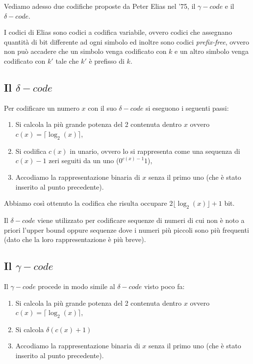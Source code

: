 \documentclass[a4paper,11pt]{book}
\begin{document}
Vediamo adesso due codifiche proposte da Peter Elias nel '75, il $\gamma-code$ e il $\delta-code$.

I codici di Elias sono codici a codifica variabile, ovvero codici che assegnano quantit\`a di bit differente ad ogni simbolo ed inoltre sono codici \emph{prefix-free}, ovvero non pu\`o accadere che un simbolo venga codificato con $k$ e un altro simbolo venga codificato con $k'$ tale che $k'$ \`e prefisso di $k$.

\subsection{Il $\delta-code$}

Per codificare un numero $x$ con il suo $\delta-code$ si eseguono i seguenti passi:
\begin{enumerate}
\item Si calcola la pi\`u grande potenza del 2 contenuta dentro $x$ ovvero $c(x) = \lceil \log_2 (x) \rceil$,
\item Si codifica $c(x)$ in unario, ovvero lo si rappresenta come una sequenza di $c(x)-1$ zeri seguiti da un uno ($0^{c(x)-1}1$),
\item Accodiamo la rappresentazione binaria di $x$ senza il primo uno (che \`e stato inserito al punto precedente). 
\end{enumerate}

Abbiamo cos\`i ottenuto la codifica che risulta occupare $2 \lfloor \log_2 (x) \rfloor + 1$ bit.

Il $\delta-code$ viene utilizzato per codificare sequenze di numeri di cui non \`e noto a priori l'upper bound oppure sequenze dove i numeri pi\`u piccoli sono pi\`u frequenti (dato che la loro rappresentazione \`e pi\`u breve).

\subsection{Il $\gamma-code$}

Il $\gamma-code$ procede in modo simile al $\delta-code$ visto poco fa:

\begin{enumerate}
\item Si calcola la pi\`u grande potenza del 2 contenuta dentro $x$ ovvero $c(x) = \lceil \log_2 (x) \rceil$,
\item Si calcola $\delta(c(x)+1)$
\item Accodiamo la rappresentazione binaria di $x$ senza il primo uno (che \`e stato inserito al punto precedente). 
\end{enumerate}
\end{document}
